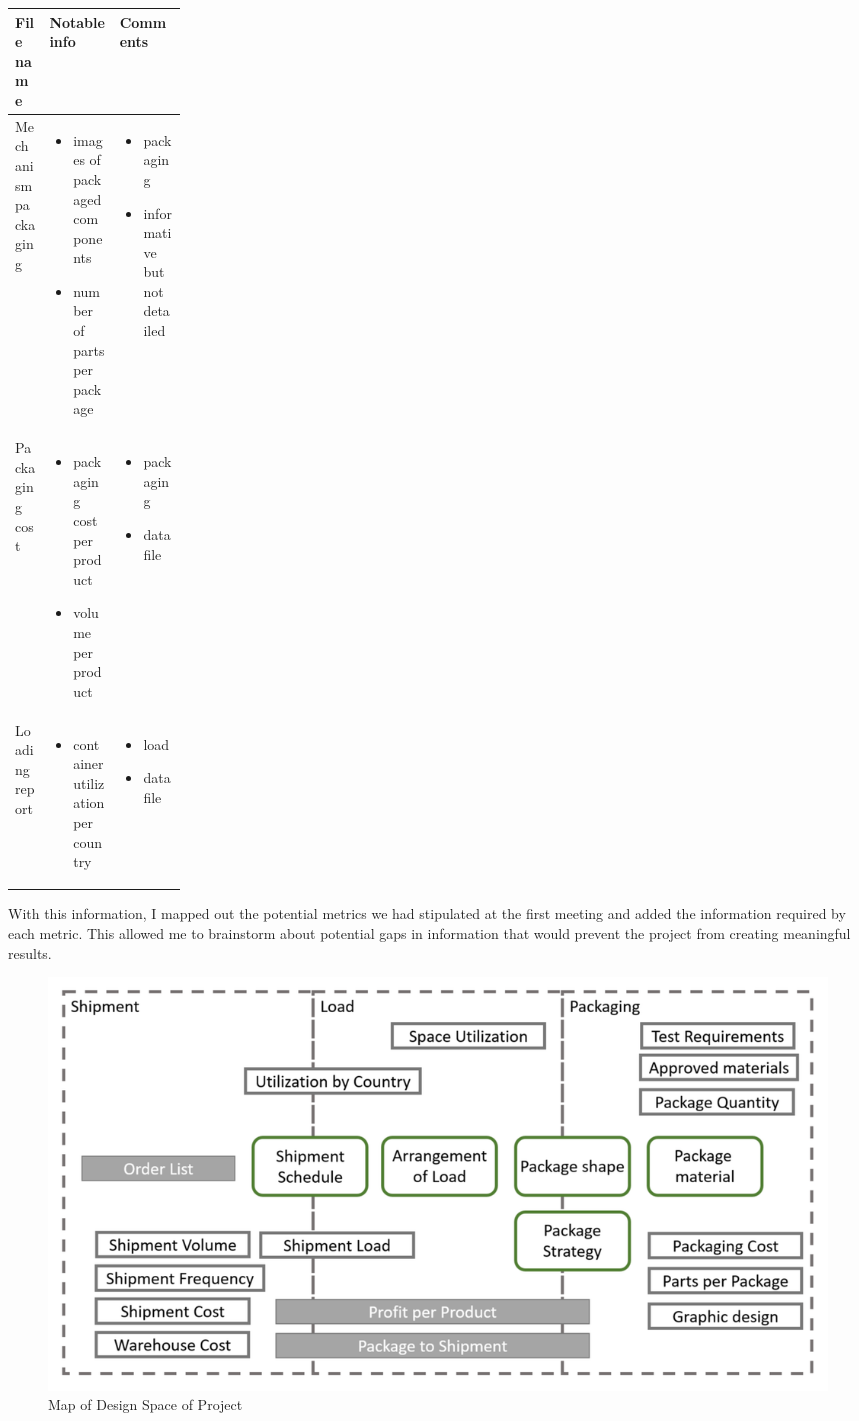 \documentclass[a4paper, fleqn]{article}
\begin{document}
\begin{center}
\begin{tabular}{| p{0.2\linewidth} | p{} | p{} |}
\hline
File name & Notable info & Comments\\
\hline
Mechanism packaging & \begin{itemize}
\item images of packaged components
\item number of parts per package
\end{itemize}  & \begin{itemize}
\item packaging
\item informative but not detailed
\end{itemize}\\
\hline
Packaging cost & \begin{itemize}
\item packaging cost per product
\item volume per product
\end{itemize}  & \begin{itemize}
\item packaging
\item data file
\end{itemize}\\
\hline
Loading report & \begin{itemize}
\item container utilization per country
\end{itemize}  & \begin{itemize}
\item load
\item data file
\end{itemize}\\
\hline
\end{tabular}
\end{center}
With this information, I mapped out the potential metrics we had stipulated at the first meeting and added the information required by each metric. This allowed me to brainstorm about potential gaps in information that would prevent the project from creating meaningful results.\\
\begin{figure}[h!]
\includegraphics[width=\linewidth]{./assets/201802260436.PNG}
\caption{Map of Design Space of Project}
\label{figure:image1}
\end{figure}
\end{document}
